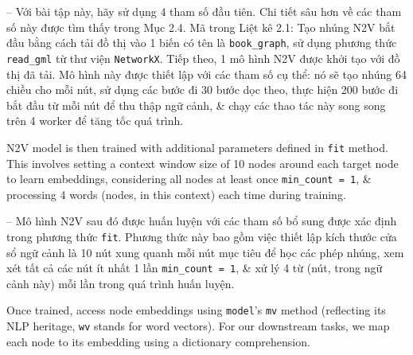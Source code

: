 \documentclass{article}
\begin{document}
\begin{itemize}
\begin{itemize}
\begin{itemize}
           -- Với bài tập này, hãy sử dụng 4 tham số đầu tiên. Chi tiết sâu hơn về các tham số này được tìm thấy trong Mục 2.4. Mã trong {\sf Liệt kê 2.1: Tạo nhúng N2V} bắt đầu bằng cách tải đồ thị vào 1 biến có tên là \verb|book_graph|, sử dụng phương thức \verb|read_gml| từ thư viện {\tt NetworkX}. Tiếp theo, 1 mô hình N2V {\tt} được khởi tạo với đồ thị đã tải. Mô hình này được thiết lập với các tham số cụ thể: nó sẽ tạo nhúng 64 chiều cho mỗi nút, sử dụng các bước đi 30 bước dọc theo, thực hiện 200 bước đi bắt đầu từ mỗi nút để thu thập ngữ cảnh, \& chạy các thao tác này song song trên 4 worker để tăng tốc quá trình.

           N2V model is then trained with additional parameters defined in {\tt fit} method. This involves setting a context window size of 10 nodes around each target node to learn embeddings, considering all nodes at least once \verb|min_count = 1|, \& processing 4 words (nodes, in this context) each time during training.

           -- Mô hình N2V sau đó được huấn luyện với các tham số bổ sung được xác định trong phương thức {\tt fit}. Phương thức này bao gồm việc thiết lập kích thước cửa sổ ngữ cảnh là 10 nút xung quanh mỗi nút mục tiêu để học các phép nhúng, xem xét tất cả các nút ít nhất 1 lần \verb|min_count = 1|, \& xử lý 4 từ (nút, trong ngữ cảnh này) mỗi lần trong quá trình huấn luyện.

           Once trained, access node embeddings using {\tt model}'s {\tt mv} method (reflecting its NLP heritage, {\tt wv} stands for word vectors). For our downstream tasks, we map each node to its embedding using a dictionary comprehension.


\end{itemize}
\end{itemize}
\end{itemize}
\end{document}
